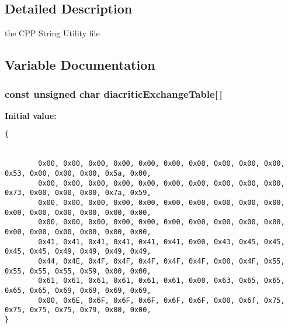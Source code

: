 \subsection{Detailed Description}
the CPP String Utility file 



\subsection{Variable Documentation}
\subsubsection[{diacriticExchangeTable}]{\setlength{\rightskip}{0pt plus 5cm}const unsigned char diacriticExchangeTable[$\,$]}\label{CPPStringUtils_8cc_f72653d4ea4ec44c18974a29d6991d5e}


\textbf{Initial value:}

\begin{Code}\begin{verbatim}
{
        
    
        0x00, 0x00, 0x00, 0x00, 0x00, 0x00, 0x00, 0x00, 0x00, 0x00, 0x53, 0x00, 0x00, 0x00, 0x5a, 0x00, 
        0x00, 0x00, 0x00, 0x00, 0x00, 0x00, 0x00, 0x00, 0x00, 0x00, 0x73, 0x00, 0x00, 0x00, 0x7a, 0x59, 
        0x00, 0x00, 0x00, 0x00, 0x00, 0x00, 0x00, 0x00, 0x00, 0x00, 0x00, 0x00, 0x00, 0x00, 0x00, 0x00, 
        0x00, 0x00, 0x00, 0x00, 0x00, 0x00, 0x00, 0x00, 0x00, 0x00, 0x00, 0x00, 0x00, 0x00, 0x00, 0x00, 
        0x41, 0x41, 0x41, 0x41, 0x41, 0x41, 0x00, 0x43, 0x45, 0x45, 0x45, 0x45, 0x49, 0x49, 0x49, 0x49, 
        0x44, 0x4E, 0x4F, 0x4F, 0x4F, 0x4F, 0x4F, 0x00, 0x4F, 0x55, 0x55, 0x55, 0x55, 0x59, 0x00, 0x00, 
        0x61, 0x61, 0x61, 0x61, 0x61, 0x61, 0x00, 0x63, 0x65, 0x65, 0x65, 0x65, 0x69, 0x69, 0x69, 0x69, 
        0x00, 0x6E, 0x6F, 0x6F, 0x6F, 0x6F, 0x6F, 0x00, 0x6f, 0x75, 0x75, 0x75, 0x75, 0x79, 0x00, 0x00, 
}
\end{verbatim}
\end{Code}
